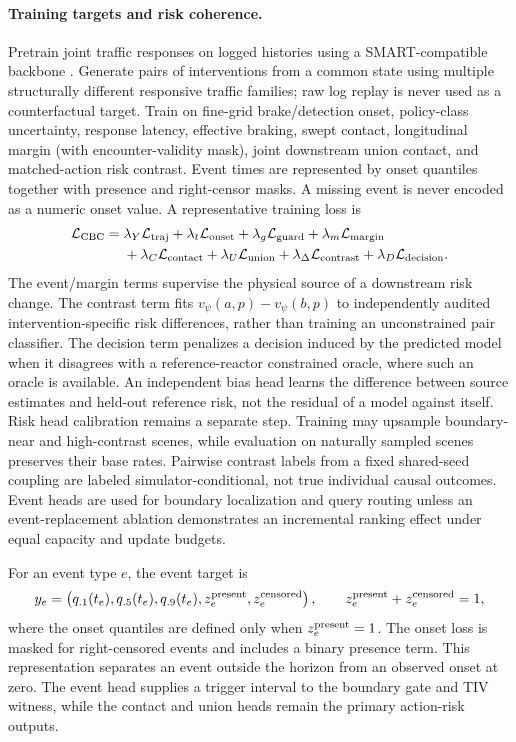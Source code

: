 \documentclass[10pt]{article}
\begin{document}
\paragraph{Training targets and risk coherence.}
Pretrain joint traffic responses on logged histories using a SMART-compatible backbone \parencite{wu2024smart}. Generate pairs of interventions from a common state using multiple structurally different responsive traffic families; raw log replay is never used as a counterfactual target. Train on fine-grid brake/detection onset, policy-class uncertainty, response latency, effective braking, swept contact, longitudinal margin (with encounter-validity mask), joint downstream union contact, and matched-action risk contrast. Event times are represented by onset quantiles together with presence and right-censor masks. A missing event is never encoded as a numeric onset value. A representative training loss is
\begin{align}
 \mathcal L_{\rm CBC}={}&\lambda_Y\mathcal L_{\rm traj}+\lambda_t\mathcal L_{\rm onset}
 +\lambda_g\mathcal L_{\rm guard}+\lambda_m\mathcal L_{\rm margin}\nonumber\\
 &+\lambda_C\mathcal L_{\rm contact}+\lambda_U\mathcal L_{\rm union}
 +\lambda_\Delta\mathcal L_{\rm contrast}
 +\lambda_D\mathcal L_{\rm decision}.
 \label{eq:cbcloss}
\end{align}
The event/margin terms supervise the physical source of a downstream risk change. The contrast term fits $v_\psi(a,p)-v_\psi(b,p)$ to independently audited intervention-specific risk differences, rather than training an unconstrained pair classifier. The decision term penalizes a decision induced by the predicted model when it disagrees with a reference-reactor constrained oracle, where such an oracle is available. An independent bias head learns the difference between source estimates and held-out reference risk, not the residual of a model against itself. Risk head calibration remains a separate step. Training may upsample boundary-near and high-contrast scenes, while evaluation on naturally sampled scenes preserves their base rates. Pairwise contrast labels from a fixed shared-seed coupling are labeled simulator-conditional, not true individual causal outcomes. Event heads are used for boundary localization and query routing unless an event-replacement ablation demonstrates an incremental ranking effect under equal capacity and update budgets.

For an event type $e$, the event target is
\begin{equation}
 y_e=\left(q_{.1}(t_e),q_{.5}(t_e),q_{.9}(t_e),
 z_e^{\rm present},z_e^{\rm censored}\right),
 \qquad z_e^{\rm present}+z_e^{\rm censored}=1,
 \label{eq:eventtarget}
\end{equation}
where the onset quantiles are defined only when $z_e^{\rm present}=1$. The
onset loss is masked for right-censored events and includes a binary presence
term. This representation separates an event outside the horizon from an
observed onset at zero. The event head supplies a trigger interval to the
boundary gate and TIV witness, while the contact and union heads remain the
primary action-risk outputs.
\end{document}

